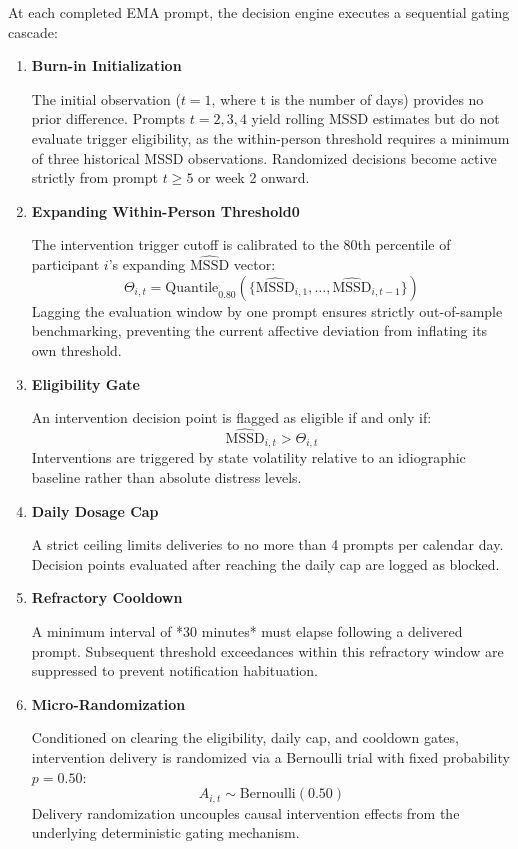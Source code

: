 \documentclass[11pt,letterpaper]{article}
\begin{document}
At each completed EMA prompt, the decision engine executes a sequential gating cascade:
\begin{enumerate}
    \item \textbf{Burn-in Initialization} 
    
    The initial observation ($t = 1$, where t is the number of days) provides no prior difference. Prompts $t = 2, 3, 4$ yield rolling MSSD estimates but do not evaluate trigger eligibility, as the within-person threshold requires a minimum of three historical MSSD observations. Randomized decisions become active strictly from prompt $t \ge 5$ or week 2 onward.
    
    \item \textbf{Expanding Within-Person Threshold0} 
    
    The intervention trigger cutoff is calibrated to the 80th percentile of participant $i$'s expanding $\widehat{\text{MSSD}}$ vector:
    \begin{equation}
    \Theta_{i,t} = \text{Quantile}_{0.80}\left(\{\widehat{\text{MSSD}}_{i,1}, \dots, \widehat{\text{MSSD}}_{i,t-1}\}\right)
    \end{equation}
    Lagging the evaluation window by one prompt ensures strictly out-of-sample benchmarking, preventing the current affective deviation from inflating its own threshold.
    
    \item \textbf{Eligibility Gate} 
    
    An intervention decision point is flagged as eligible if and only if:
    \begin{equation}
    \widehat{\text{MSSD}}_{i,t} > \Theta_{i,t}
    \end{equation}
    Interventions are triggered by state volatility relative to an idiographic baseline rather than absolute distress levels.
    
    \item \textbf{Daily Dosage Cap} 
    
    A strict ceiling limits deliveries to no more than 4 prompts per calendar day. Decision points evaluated after reaching the daily cap are logged as blocked.
    
    \item \textbf{Refractory Cooldown} 
    
    A minimum interval of *30 minutes* must elapse following a delivered prompt. Subsequent threshold exceedances within this refractory window are suppressed to prevent notification habituation.
    
    \item \textbf{Micro-Randomization} 
    
    Conditioned on clearing the eligibility, daily cap, and cooldown gates, intervention delivery is randomized via a Bernoulli trial with fixed probability $p = 0.50$:
    \begin{equation}
    A_{i,t} \sim \text{Bernoulli}(0.50)
    \end{equation}
    Delivery randomization uncouples causal intervention effects from the underlying deterministic gating mechanism.
\end{enumerate}
\end{document}
